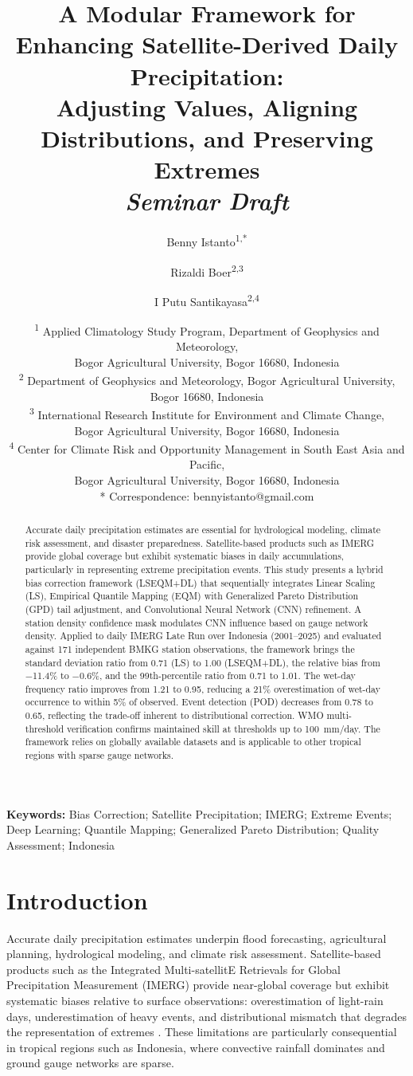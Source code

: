 \documentclass[11pt,a4paper]{article}
\title{\Large A Modular Framework for Enhancing Satellite-Derived Daily
Precipitation:\\[4pt]
Adjusting Values, Aligning Distributions, and Preserving Extremes\\[8pt]
\normalsize\textit{Seminar Draft}}
\author{\normalsize
Benny Istanto\textsuperscript{1,*} \and
Rizaldi Boer\textsuperscript{2,3} \and
I Putu Santikayasa\textsuperscript{2,4}
}
\date{\small
\textsuperscript{1} Applied Climatology Study Program, Department of Geophysics and Meteorology,\\
Bogor Agricultural University, Bogor 16680, Indonesia\\[2pt]
\textsuperscript{2} Department of Geophysics and Meteorology, Bogor Agricultural University, Bogor 16680, Indonesia\\[2pt]
\textsuperscript{3} International Research Institute for Environment and Climate Change,\\
Bogor Agricultural University, Bogor 16680, Indonesia\\[2pt]
\textsuperscript{4} Center for Climate Risk and Opportunity Management in South East Asia and Pacific,\\
Bogor Agricultural University, Bogor 16680, Indonesia\\[6pt]
* Correspondence: bennyistanto@gmail.com
}
\begin{document}
\linenumbers
\maketitle

\begin{abstract}
Accurate daily precipitation estimates are essential for hydrological
modeling, climate risk assessment, and disaster preparedness.
Satellite-based products such as IMERG provide global coverage but
exhibit systematic biases in daily accumulations, particularly in
representing extreme precipitation events. This study presents a hybrid
bias correction framework (LSEQM+DL) that sequentially integrates
Linear Scaling (LS), Empirical Quantile Mapping (EQM) with Generalized
Pareto Distribution (GPD) tail adjustment, and Convolutional Neural
Network (CNN) refinement. A station density confidence mask modulates
CNN influence based on gauge network density. Applied to daily IMERG
Late Run over Indonesia (2001--2025) and evaluated against 171
independent BMKG station observations, the framework brings the standard
deviation ratio from 0.71 (LS) to 1.00 (LSEQM+DL), the relative bias
from \(-\)11.4\% to \(-\)0.6\%, and the 99th-percentile ratio from 0.71
to 1.01. The wet-day frequency ratio improves from 1.21 to 0.95,
reducing a 21\% overestimation of wet-day occurrence to within 5\% of
observed. Event detection (POD) decreases from 0.78 to 0.65, reflecting
the trade-off inherent to distributional correction. WMO multi-threshold
verification confirms maintained skill at thresholds up to 100~mm/day.
The framework relies on globally available datasets and is applicable
to other tropical regions with sparse gauge networks.
\end{abstract}

\noindent\textbf{Keywords:} Bias Correction; Satellite Precipitation;
IMERG; Extreme Events; Deep Learning; Quantile Mapping; Generalized
Pareto Distribution; Quality Assessment; Indonesia

\section{Introduction}\label{introduction}

Accurate daily precipitation estimates underpin flood forecasting,
agricultural planning, hydrological modeling, and climate risk
assessment. Satellite-based products such as the Integrated
Multi-satellitE Retrievals for Global Precipitation Measurement (IMERG)
provide near-global coverage \cite{ref1,ref2} but exhibit systematic biases
relative to surface observations: overestimation of light-rain days,
underestimation of heavy events, and distributional mismatch that
degrades the representation of extremes \cite{ref3}. These limitations are
particularly consequential in tropical regions such as Indonesia, where
convective rainfall dominates and ground gauge networks are sparse.
\end{document}
